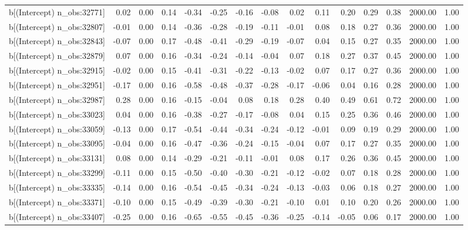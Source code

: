 \begin{table}[ht]
\begin{tabular}{rrrrrrrrrrrrrrr}
  b[(Intercept) n\_obs:32771] & 0.02 & 0.00 & 0.14 & -0.34 & -0.25 & -0.16 & -0.08 & 0.02 & 0.11 & 0.20 & 0.29 & 0.38 & 2000.00 & 1.00 \\ 
  b[(Intercept) n\_obs:32807] & -0.01 & 0.00 & 0.14 & -0.36 & -0.28 & -0.19 & -0.11 & -0.01 & 0.08 & 0.18 & 0.27 & 0.36 & 2000.00 & 1.00 \\ 
  b[(Intercept) n\_obs:32843] & -0.07 & 0.00 & 0.17 & -0.48 & -0.41 & -0.29 & -0.19 & -0.07 & 0.04 & 0.15 & 0.27 & 0.35 & 2000.00 & 1.00 \\ 
  b[(Intercept) n\_obs:32879] & 0.07 & 0.00 & 0.16 & -0.34 & -0.24 & -0.14 & -0.04 & 0.07 & 0.18 & 0.27 & 0.37 & 0.45 & 2000.00 & 1.00 \\ 
  b[(Intercept) n\_obs:32915] & -0.02 & 0.00 & 0.15 & -0.41 & -0.31 & -0.22 & -0.13 & -0.02 & 0.07 & 0.17 & 0.27 & 0.36 & 2000.00 & 1.00 \\ 
  b[(Intercept) n\_obs:32951] & -0.17 & 0.00 & 0.16 & -0.58 & -0.48 & -0.37 & -0.28 & -0.17 & -0.06 & 0.04 & 0.16 & 0.28 & 2000.00 & 1.00 \\ 
  b[(Intercept) n\_obs:32987] & 0.28 & 0.00 & 0.16 & -0.15 & -0.04 & 0.08 & 0.18 & 0.28 & 0.40 & 0.49 & 0.61 & 0.72 & 2000.00 & 1.00 \\ 
  b[(Intercept) n\_obs:33023] & 0.04 & 0.00 & 0.16 & -0.38 & -0.27 & -0.17 & -0.08 & 0.04 & 0.15 & 0.25 & 0.36 & 0.46 & 2000.00 & 1.00 \\ 
  b[(Intercept) n\_obs:33059] & -0.13 & 0.00 & 0.17 & -0.54 & -0.44 & -0.34 & -0.24 & -0.12 & -0.01 & 0.09 & 0.19 & 0.29 & 2000.00 & 1.00 \\ 
  b[(Intercept) n\_obs:33095] & -0.04 & 0.00 & 0.16 & -0.47 & -0.36 & -0.24 & -0.15 & -0.04 & 0.07 & 0.17 & 0.27 & 0.35 & 2000.00 & 1.00 \\ 
  b[(Intercept) n\_obs:33131] & 0.08 & 0.00 & 0.14 & -0.29 & -0.21 & -0.11 & -0.01 & 0.08 & 0.17 & 0.26 & 0.36 & 0.45 & 2000.00 & 1.00 \\ 
  b[(Intercept) n\_obs:33299] & -0.11 & 0.00 & 0.15 & -0.50 & -0.40 & -0.30 & -0.21 & -0.12 & -0.02 & 0.07 & 0.18 & 0.28 & 2000.00 & 1.00 \\ 
  b[(Intercept) n\_obs:33335] & -0.14 & 0.00 & 0.16 & -0.54 & -0.45 & -0.34 & -0.24 & -0.13 & -0.03 & 0.06 & 0.18 & 0.27 & 2000.00 & 1.00 \\ 
  b[(Intercept) n\_obs:33371] & -0.10 & 0.00 & 0.15 & -0.49 & -0.39 & -0.30 & -0.21 & -0.10 & 0.01 & 0.10 & 0.20 & 0.26 & 2000.00 & 1.00 \\ 
  b[(Intercept) n\_obs:33407] & -0.25 & 0.00 & 0.16 & -0.65 & -0.55 & -0.45 & -0.36 & -0.25 & -0.14 & -0.05 & 0.06 & 0.17 & 2000.00 & 1.00 \\ 

\end{tabular}
\end{table}

